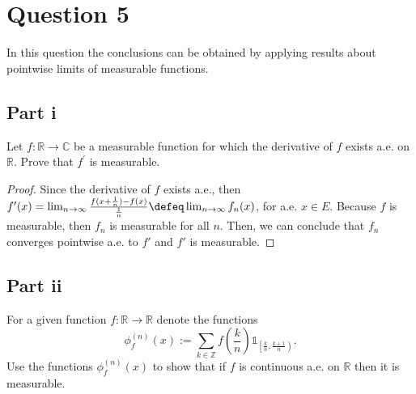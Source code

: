 \section{Question 5}

\begin{question}
    In this question the conclusions can be obtained by applying results about pointwise limits of measurable functions.
\end{question}

\subsection{Part i}

\begin{question}
    Let $f: \mathbb{R} \rightarrow \mathbb{C}$ be a measurable function for which the derivative of $f$ exists a.e. on $\mathbb{R}$. Prove that $f^{\prime}$ is measurable.
\end{question}

\begin{answer}
    \begin{proof}
        Since the derivative of $f$ exists a.e., then $f'(x) = \lim_{n \to \infty}\tfrac{f(x+\frac{1}{n}) - f(x)}{\frac{1}{n}} \defeq \lim_{n \to \infty}f_n(x)$, for a.e. $x \in E$. Because $f$ is measurable, then $f_n$ is measurable for all $n$. Then, we can conclude that $f_n$ converges pointwise a.e. to $f'$ and $f'$ is measurable.
    \end{proof}
\end{answer}

\subsection{Part ii}

\begin{question}
    For a given function $f: \mathbb{R} \rightarrow \mathbb{R}$ denote the functions
    $$
    \phi_f^{(n)}(x):=\sum_{k \in \mathbb{Z}} f\left(\frac{k}{n}\right) \mathbb{1}_{\left[\frac{k}{n}, \frac{k+1}{n}\right)} .
    $$
    Use the functions $\phi_f^{(n)}(x)$ to show that if $f$ is continuous a.e. on $\mathbb{R}$ then it is measurable.
\end{question}

